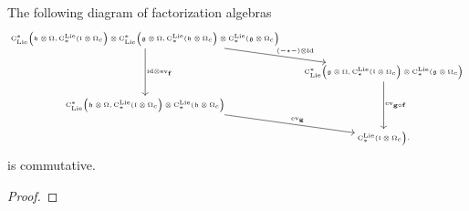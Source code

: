 \documentclass[11pt]{amsart}
\numberwithin{equation}{section}
\begin{document}
 
 
\begin{lmm}\label{L:NatPptyofComp}
 The following diagram of factorization algebras 
 \[\tiny \begin{tikzcd}
 \clies\big(\fh \otimes \Omega, \cliels(\fl \otimes \Omega_c  \big) 
 \otimes  \clies\big(\fg \otimes \Omega, \cliels(\fh \otimes \Omega_c  \big) 
 \otimes \cliels(\fg \otimes \Omega_c  \big) \arrow[rd, "(-\star-)\otimes \id"]
 \arrow[dd, "\id\otimes \ev_ {\mathbf{f}}"]& \\ 
 & \clies\big(\fg \otimes \Omega, \cliels(\fl \otimes \Omega_c  \big) 
 \otimes \cliels(\fg \otimes \Omega_c  \big)
 \arrow[dd, "\ev_{\mathbf{g}\circ \mathbf{f}}"]\\
\clies\big(\fh \otimes \Omega, \cliels(\fl \otimes \Omega_c  \big) 
 \otimes \cliels(\fh \otimes \Omega_c  \big)  \arrow[rd, "\ev_{\mathbf{g}}"] & \\  & \cliels(\fl \otimes \Omega_c  \big). 
\end{tikzcd}\]
 is commutative.
\end{lmm}
\begin{proof}
 
\end{proof}
\end{document}
